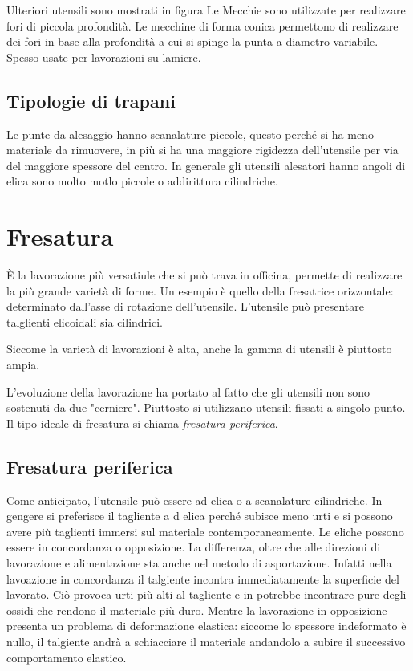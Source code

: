 Ulteriori utensili sono mostrati in figura
Le Mecchie sono utilizzate per realizzare fori di piccola profondità.
Le mecchine di forma conica permettono di realizzare dei fori in base alla profondità a cui si spinge la punta
a diametro variabile. Spesso usate per lavorazioni su lamiere.


\subsection{Tipologie di trapani}

Le punte da alesaggio hanno scanalature piccole, questo perché si ha meno materiale da rimuovere, in più 
si ha una maggiore rigidezza dell'utensile per via del maggiore spessore del centro.
In generale gli utensili alesatori hanno angoli di elica sono molto motlo piccole o addirittura cilindriche.

\section{Fresatura}
È la lavorazione più versatiule che si può trava in officina, permette di realizzare la più grande varietà 
di forme.
Un esempio è quello della fresatrice orizzontale: determinato dall'asse di rotazione dell'utensile.
L'utensile può presentare talglienti elicoidali sia cilindrici.

Siccome la varietà di lavorazioni è alta, anche la gamma di utensili è piuttosto ampia.

L'evoluzione della lavorazione ha portato al fatto che gli utensili non sono sostenuti da due "cerniere".
Piuttosto si utilizzano utensili fissati a singolo punto.
Il tipo ideale di fresatura si chiama \emph{fresatura periferica}.

\subsection{Fresatura periferica}
Come anticipato, l'utensile può essere ad elica o a scanalature cilindriche. In gengere si preferisce 
il tagliente a d elica perché subisce meno urti e si possono avere più taglienti immersi sul materiale
contemporaneamente. 
Le eliche possono essere in concordanza o opposizione.
La differenza, oltre che alle direzioni di lavorazione e alimentazione sta anche nel metodo di asportazione.
Infatti nella lavoazione in concordanza il talgiente incontra immediatamente la superficie del lavorato.
Ciò provoca urti più alti al tagliente e in potrebbe incontrare pure degli ossidi che rendono il materiale
più duro.
Mentre la lavorazione in opposizione presenta un problema di deformazione elastica: siccome lo spessore 
indeformato è nullo, il talgiente andrà a schiacciare il materiale andandolo a subire il successivo 
comportamento elastico.


